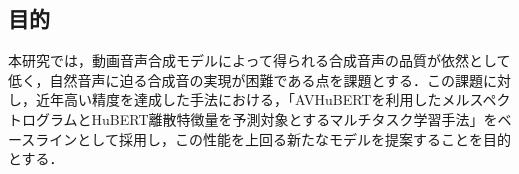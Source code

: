 \documentclass[12pt]{jarticle}
\numberwithin{equation}{section}    %
\numberwithin{figure}{section}      %
\numberwithin{table}{section}      %
\begin{document}

\subsection{目的}
本研究では，動画音声合成モデルによって得られる合成音声の品質が依然として低く，自然音声に迫る合成音の実現が困難である点を課題とする．この課題に対し，近年高い精度を達成した手法\cite{choi2023intelligible}における，「AVHuBERTを利用したメルスペクトログラムとHuBERT離散特徴量を予測対象とするマルチタスク学習手法」をベースラインとして採用し，この性能を上回る新たなモデルを提案することを目的とする．

\end{document}

